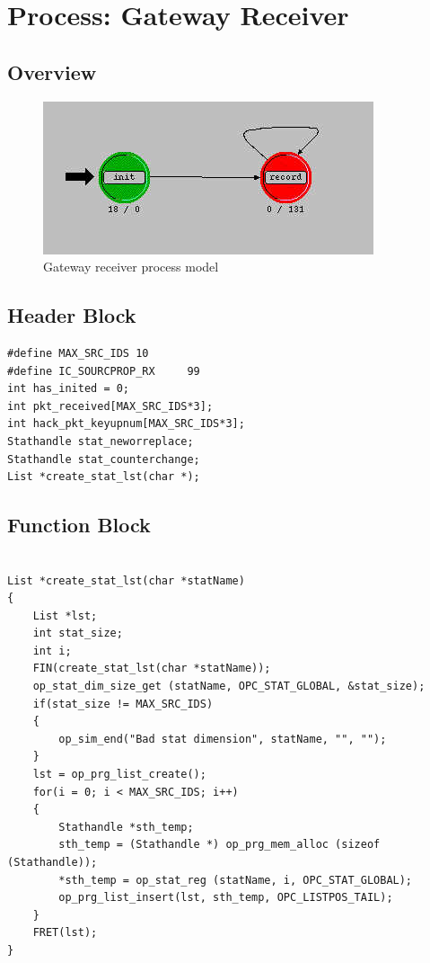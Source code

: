 
\section{Process: Gateway Receiver}

\subsection{Overview}
\begin{figure}[ht]
    \centering
    \includegraphics[width=.7\textwidth]{images/gateway_rcvr}
    \caption{Gateway receiver process model}
    \label{fig:appendix-f}
\end{figure}


\subsection{Header Block}
{\tiny
\begin{verbatim}
#define MAX_SRC_IDS	10
#define IC_SOURCPROP_RX 	99
int has_inited = 0;
int pkt_received[MAX_SRC_IDS*3];
int hack_pkt_keyupnum[MAX_SRC_IDS*3];
Stathandle stat_neworreplace;
Stathandle stat_counterchange;
List *create_stat_lst(char *);

\end{verbatim}
}

\subsection{Function Block}
{\tiny
\begin{verbatim}

List *create_stat_lst(char *statName)
{
	List *lst;
	int stat_size;
	int i;
	FIN(create_stat_lst(char *statName));
	op_stat_dim_size_get (statName, OPC_STAT_GLOBAL, &stat_size);
	if(stat_size != MAX_SRC_IDS)
	{
		op_sim_end("Bad stat dimension", statName, "", "");
	}
	lst = op_prg_list_create();
	for(i = 0; i < MAX_SRC_IDS; i++)
	{
		Stathandle *sth_temp;
		sth_temp = (Stathandle *) op_prg_mem_alloc (sizeof (Stathandle));
		*sth_temp = op_stat_reg (statName, i, OPC_STAT_GLOBAL);
		op_prg_list_insert(lst, sth_temp, OPC_LISTPOS_TAIL);
	}
	FRET(lst);
}

\end{verbatim}
}
